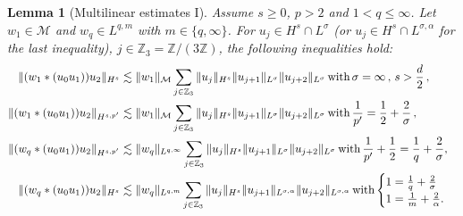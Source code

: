 \documentclass[12pt]{article}
\theoremstyle{plain}
\newtheorem{lemma}[theo]{Lemma}
\newcommand{\meas}{\mathcal{M}}
\begin{document}
\begin{lemma}[Multilinear estimates I]\label{lem:bounds-forcing-short-range I}
Assume $s\geq0$, $p>2$ and $1< q\leq \infty$.
Let $w_{1}\in\meas$ and $w_{q}\in L^{q,m}$ with $m \in \{q, \infty\}$.
For $u_j\in H^s\cap L^\sigma$ %
(or $u_j\in H^s\cap L^{\sigma,\alpha}$ for the last inequality),
 $j\in  \mathbb{Z}_3 = \mathbb{Z}/(3\mathbb{Z})$, the following inequalities hold:
\begin{align}
\|(w_{1}*(u_{0}u_{1}))u_{2}\|_{H^{s}} &  \lesssim\|w_{1}\|_{\meas}\sum_{j\in\mathbb{Z}_{3}}\|u_{j}\|_{H^{s}}\|u_{j+1}\|_{L^{\sigma}}\|u_{j+2}\|_{L^{\sigma}} \, \textnormal{with} \, \sigma = \infty \,, \, s>\frac{d}{2}\,,  \label{eq:convolution-Hartree-Hs-M1}\\
 \allowdisplaybreaks
\|(w_{1}*(u_{0}u_{1}))u_{2}\|_{H^{s,p'}} & \lesssim\|w_{1}\|_{\meas}\sum_{j\in\mathbb{Z}_{3}}\|u_{j}\|_{H^{s}} \|u_{j+1}\|_{L^{\sigma}} \|u_{j+2}\|_{L^{\sigma}} \, \textnormal{with} \, \frac{1}{p'} = \frac{1}{2}+\frac{2}{\sigma}\,, \label{eq:convolution-Hartree-Hspprime-M1}\\
\|(w_{q}*(u_{0}u_{1}))u_{2}\|_{H^{s,p'}} & \lesssim\|w_{q}\|_{L^{q,\infty}}\sum_{j\in\mathbb{Z}_{3}}\|u_{j}\|_{H^{s}} \|u_{j+1}\|_{L^{\sigma}} \|u_{j+2}\|_{L^{\sigma}} \, \textnormal{with} \, \frac{1}{p'}+\frac{1}{2}=\frac{1}{q}+\frac{2}{\sigma}, \label{eq:convolution-Hartree-Hspprime-Lq}\\
\|(w_{q}*(u_{0}u_{1}))u_{2}\|_{H^{s}} &  \lesssim\|w_{q}\|_{L^{q,m}}\sum_{j\in\mathbb{Z}_{3}}\|u_{j}\|_{H^{s}} \|u_{j+1}\|_{L^{\sigma,\alpha}} \|u_{j+2}\|_{L^{\sigma,\alpha}}  \, \textnormal{with} \begin{cases}
    1=\frac{1}{q}+\frac{2}{\sigma}\\
    1=\frac{1}{m}+\frac{2}{\alpha} . 
\end{cases}\label{eq:convolution-Hartree-Hs-Lq}
\end{align}
\end{lemma}
\end{document}
